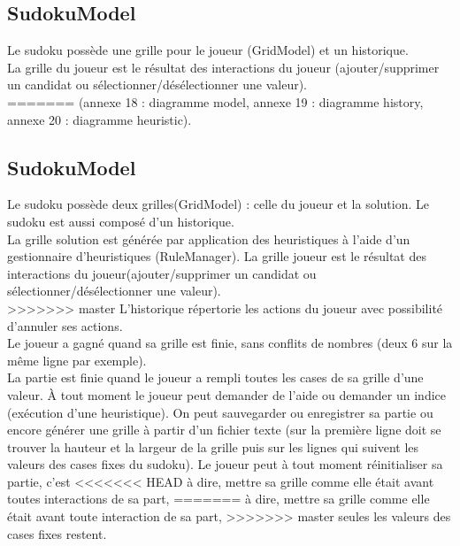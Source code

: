 \subsection{SudokuModel}
Le sudoku possède une grille pour le joueur (GridModel) et un historique.\\ 
La grille du joueur est le résultat des interactions du joueur (ajouter/supprimer 
un candidat ou sélectionner/désélectionner une valeur). \\
=======
(annexe 18 : diagramme model,
annexe 19 : diagramme history,
annexe 20 : diagramme heuristic).

\subsection{SudokuModel}
Le sudoku possède deux grilles(GridModel) : celle du joueur et la solution. 
Le sudoku est aussi composé d'un historique.\\
La grille solution est générée par application des heuristiques à l’aide 
d’un gestionnaire d’heuristiques (RuleManager). La grille
joueur est le résultat des interactions du joueur(ajouter/supprimer un candidat 
ou sélectionner/désélectionner une valeur). \\
>>>>>>> master
L’historique répertorie les actions du joueur avec possibilité d’annuler ses actions.\\ 
Le joueur a gagné quand sa grille est finie, sans conflits de nombres 
(deux 6 sur la même ligne par exemple).\\
La partie est finie quand le joueur a rempli toutes les cases de sa grille d’une valeur. 
À tout moment le joueur peut demander de l’aide ou demander un indice (exécution d’une
heuristique). On peut sauvegarder ou enregistrer sa partie ou encore générer une grille
à partir d’un fichier texte (sur la première ligne doit se trouver la hauteur
et la largeur de la grille puis sur les lignes qui suivent les valeurs des cases
fixes du sudoku). Le joueur peut à tout moment réinitialiser sa partie, c’est
<<<<<<< HEAD
à dire, mettre sa grille comme elle était avant toutes interactions de sa part,
=======
à dire, mettre sa grille comme elle était avant toute interaction de sa part,
>>>>>>> master
seules les valeurs des cases fixes restent.

